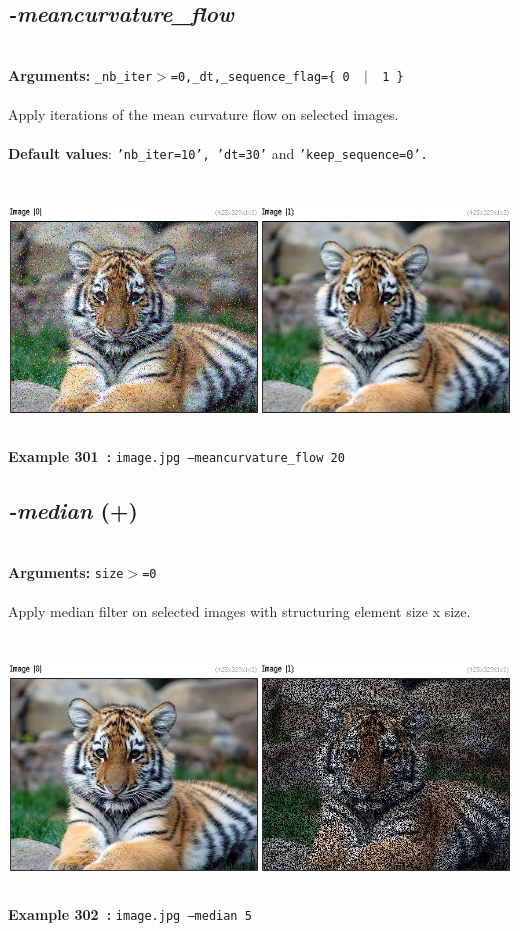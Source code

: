 \documentclass[a4paper,11pt,twoside]{book}
\begin{document}
\subsection{\emph{-meancurvature\_flow} }\vspace*{-0.5em}
~\\\textbf{Arguments: } 
{\small \texttt{\_nb\_iter$>$=0,\_dt,\_sequence\_flag=\{ 0 ~$|$~ 1 \}}}\\~\\
Apply iterations of the mean curvature flow on selected images.
~\\~\\\textbf{Default values}: {\small \texttt{'nb\_iter=10', 'dt=30'} and \texttt{'keep\_sequence=0'.}}
\begin{center}\includegraphics[keepaspectratio=true,height=7cm,width=\textwidth]{img/gmic_def301.jpg}\\
{\footnotesize \textbf{Example 301~:} \texttt{image.jpg --meancurvature\_flow 20}}
\end{center}

\subsection{\emph{-median} (+)}\vspace*{-0.5em}
~\\\textbf{Arguments: } 
{\small \texttt{size$>$=0}}\\~\\
Apply median filter on selected images with structuring element size x size.
\begin{center}\includegraphics[keepaspectratio=true,height=7cm,width=\textwidth]{img/gmic_def302.jpg}\\
{\footnotesize \textbf{Example 302~:} \texttt{image.jpg --median 5}}
\end{center}
\end{document}
